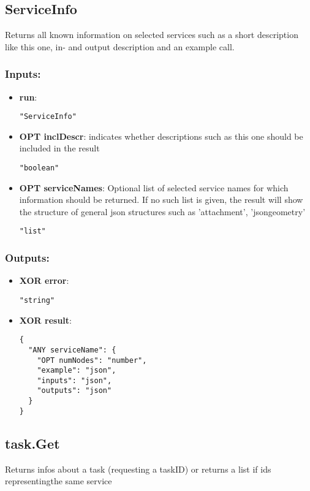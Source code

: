 \subsection{ServiceInfo}
Returns
 all known information on selected services such as a short description 
like this one, in- and output description and an example call. 
\subsubsection*{Inputs:}
\begin{itemize}
    \item \textbf{run}: 
\begin{lstlisting}
"ServiceInfo"
\end{lstlisting}
    \item \textbf{OPT inclDescr}: indicates whether descriptions such as this one should be included in the result
\begin{lstlisting}
"boolean"
\end{lstlisting}
    \item \textbf{OPT serviceNames}: Optional list of selected service names for which information should  be returned. If no such list is given, the result will show the  structure of general json structures such as 'attachment',  'jsongeometry'
\begin{lstlisting}
"list"
\end{lstlisting}
  \end{itemize}

\subsubsection*{Outputs:}
\begin{itemize}
    \item \textbf{XOR error}: 
\begin{lstlisting}
"string"
\end{lstlisting}
    \item \textbf{XOR result}: 
\begin{lstlisting}
{
  "ANY serviceName": {
    "OPT numNodes": "number", 
    "example": "json", 
    "inputs": "json", 
    "outputs": "json"
  }
}
\end{lstlisting}
  \end{itemize}

\subsection{task.Get}
Returns infos about a task (requesting a taskID) or returns a list if ids representingthe same service

